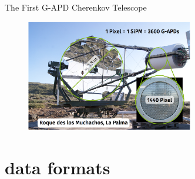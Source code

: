 

\makeatletter
    \newenvironment{withoutheadline}{
        \setbeamertemplate{headline}[default]
        \def\beamer@entrycode{\vspace*{-\headheight}}
    }{}
\makeatother


{
\maketitle
}

\begin{frame}[t]{The First G-APD Cherenkov Telescope}

    \begin{figure}
        \centering\includegraphics[width=0.65\textwidth]{fig/fact.png}
    \end{figure}

\end{frame}

\section{data formats}

